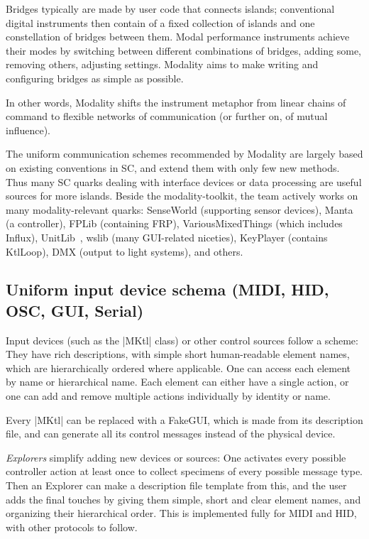 \documentclass{article}
\begin{document}
Bridges typically are made by user code that connects islands; conventional digital instruments then contain of a fixed collection of islands and one constellation of bridges between them. Modal performance instruments achieve their modes by switching between different combinations of bridges, adding some, removing others, adjusting settings. 
Modality aims to make writing and configuring bridges as simple as possible. 

In other words, Modality shifts the instrument metaphor from linear chains of command to flexible networks of communication (or further on, of mutual influence).

The uniform communication schemes recommended by Modality are largely based on existing conventions in SC, and extend them with only few new methods. Thus many SC quarks dealing with interface devices or data processing are useful sources for more islands. 
Beside the modality-toolkit\cite{githubmodality}, the team actively works on many modality-relevant quarks: SenseWorld (supporting sensor devices), Manta (a controller), FPLib (containing FRP), VariousMixedThings (which includes Influx), UnitLib~\cite{-uni}, wslib (many GUI-related niceties), KeyPlayer (contains KtlLoop), DMX (output to light systems), and others.

\subsection{ Uniform input device schema (MIDI, HID, OSC, GUI, Serial) }

Input devices (such as the |MKtl| class) or other control sources follow a scheme: 
They have rich descriptions, with simple short human-readable element names, which are hierarchically ordered where applicable. 
One can access each element by name or hierarchical name.
Each element can either have a single action, or one can add and remove multiple actions individually by identity or name.

Every |MKtl| can be replaced with a FakeGUI, which is made from its description file, and can generate all its control messages instead of the physical device.

\emph{Explorers} simplify adding new devices or sources: 
One activates every possible controller action at least once to collect specimens of every possible message type. 
Then an Explorer can make a description file template from this, and the user adds the final touches by giving them simple, short and clear element names, and organizing their hierarchical order. 
This is implemented fully for MIDI and HID, with other protocols to follow.
\end{document}

